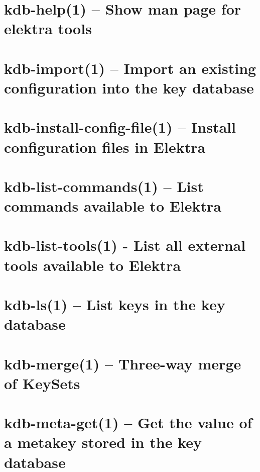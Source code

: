\let\mypdfximage\pdfximage\def\pdfximage{\immediate\mypdfximage}\documentclass[twoside]{book}
\newcommand{\+}{\discretionary{\mbox{\scriptsize$\hookleftarrow$}}{}{}}
\begin{document}
\chapter{kdb-\/help(1) -- Show man page for elektra tools}
\label{doc_help_kdb-help_md}

\chapter{kdb-\/import(1) -- Import an existing configuration into the key database}
\label{doc_help_kdb-import_md}

\chapter{kdb-\/install-\/config-\/file(1) -- Install configuration files in Elektra}
\label{doc_help_kdb-install-config-file_md}

\chapter{kdb-\/list-\/commands(1) -- List commands available to Elektra}
\label{doc_help_kdb-list-commands_md}

\chapter{kdb-\/list-\/tools(1) -\/ List all external tools available to Elektra}
\label{doc_help_kdb-list-tools_md}

\chapter{kdb-\/ls(1) -- List keys in the key database}
\label{doc_help_kdb-ls_md}

\chapter{kdb-\/merge(1) -- Three-\/way merge of Key\+Sets}
\label{doc_help_kdb-merge_md}

\chapter{kdb-\/meta-\/get(1) -- Get the value of a metakey stored in the key database}
\label{doc_help_kdb-meta-get_md}

\end{document}
